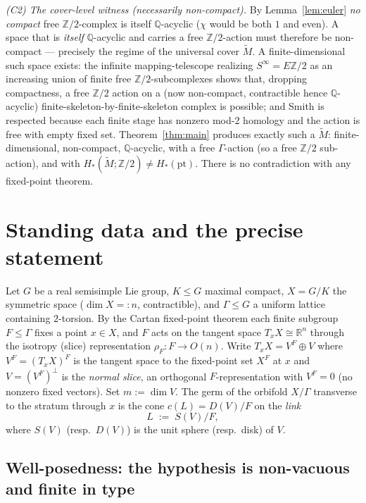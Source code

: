 \documentclass[12pt]{article}
\theoremstyle{definition}
\begin{document}
\emph{(C2) The cover-level witness (necessarily non-compact).} By
Lemma~\ref{lem:euler} \emph{no compact} free $\mathbb{Z}/2$-complex is itself
$\mathbb{Q}$-acyclic ($\chi$ would be both $1$ and even). A space that is
\emph{itself} $\mathbb{Q}$-acyclic and carries a free $\mathbb{Z}/2$-action must
therefore be non-compact --- precisely the regime of the universal cover
$\widetilde M$. A finite-dimensional such space exists: the infinite
mapping-telescope realizing $S^\infty=E\mathbb{Z}/2$ as an increasing union of
finite free $\mathbb{Z}/2$-subcomplexes shows that, dropping compactness, a free
$\mathbb{Z}/2$ action on a (now non-compact, contractible hence
$\mathbb{Q}$-acyclic) finite-skeleton-by-finite-skeleton complex is possible;
and Smith is respected because each finite stage has nonzero mod-$2$ homology
and the action is free with empty fixed set. Theorem~\ref{thm:main} produces
exactly such a $\widetilde M$: finite-dimensional, non-compact,
$\mathbb{Q}$-acyclic, with a free $\Gamma$-action (so a free $\mathbb{Z}/2$
sub-action), and with $H_*(\widetilde M;\mathbb{Z}/2)\neq H_*(\mathrm{pt})$.
There is no contradiction with any fixed-point theorem.

\section{Standing data and the precise statement}\label{sec:setup}

Let $G$ be a real semisimple Lie group, $K\le G$ maximal compact,
$X=G/K$ the symmetric space ($\dim X=:n$, contractible), and $\Gamma\le G$ a
uniform lattice containing $2$-torsion. By the Cartan fixed-point theorem each
finite subgroup $F\le\Gamma$ fixes a point $x\in X$, and $F$ acts on the
tangent space $T_xX\cong\mathbb{R}^{n}$ through the isotropy (slice)
representation $\rho_F\colon F\to O(n)$. Write $T_xX=V^F\oplus V$ where
$V^F=(T_xX)^F$ is the tangent space to the fixed-point set $X^F$ at $x$ and
$V=(V^F)^\perp$ is the \emph{normal slice}, an orthogonal $F$-representation
with $V^F=0$ (no nonzero fixed vectors). Set $m:=\dim V$. The germ of the
orbifold $X/\Gamma$ transverse to the stratum through $x$ is the cone
$c(L)=D(V)/F$ on the \emph{link}
\[
   L \;:=\; S(V)/F,
\]
where $S(V)$ (resp.\ $D(V)$) is the unit sphere (resp.\ disk) of $V$.

\subsection*{Well-posedness: the hypothesis is non-vacuous and finite in type}
\label{sec:wellposed}
\end{document}
